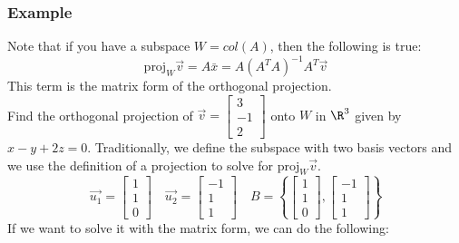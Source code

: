 \documentclass{math}
\begin{document}
\subsubsection*{Example}
Note that if you have a subspace \( W = col(A) \), then the following is true:
\[ \text{proj}_W\vec{v} = A\bar{x} = A(A^TA)^{-1}A^T\vec{v} \]
This term is the matrix form of the orthogonal projection. \\
Find the orthogonal projection of \( \vec{v} = \begin{bmatrix}3 \\ -1 \\
2\end{bmatrix} \) onto \( W \) in \( \R^3 \) given by \( x-y+2z = 0 \).
Traditionally, we define the subspace with two basis vectors and we use
the definition of a projection to solve for \( \text{proj}_W\vec{v} \).
\[ \vec{u_1} = \begin{bmatrix}1 \\ 1 \\ 0\end{bmatrix} \quad
  \vec{u_2} = \begin{bmatrix}-1 \\ 1 \\ 1\end{bmatrix} \quad
  B = \left\{\begin{bmatrix}
  1 \\ 1 \\ 0
\end{bmatrix},\begin{bmatrix}
  -1 \\ 1 \\ 1
\end{bmatrix}\right\} \]
If we want to solve it with the matrix form, we can do the following:
\end{document}
